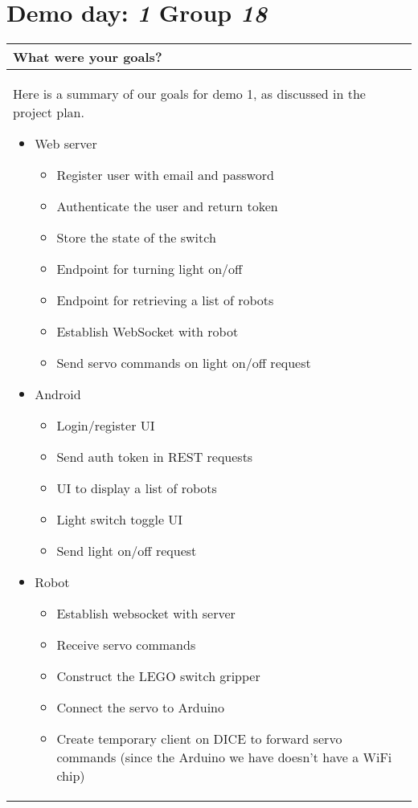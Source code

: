 \documentclass[a4paper]{article}
\newcommand{\colWidth}{141mm}
\begin{document}
 
\section*{Demo day: \textit{1} Group \textit{18}}


\begin{center}
\begin{tabular}{|p{\colWidth}|}
	\hline
	\cellcolor{blue!25}\large
	\textbf{What were your goals?}
	\\ \hline
		Here is a summary of our goals for demo 1, as discussed in the project plan.

		\begin{itemize}
			\item Web server 
				\begin{itemize}
					\item Register user with email and password
					\item Authenticate the user and return token
					\item Store the state of the switch
					\item Endpoint for turning light on/off
					\item Endpoint for retrieving a list of robots
					\item Establish WebSocket with robot
					\item Send servo commands on light on/off request
				\end{itemize}
			\item Android
				\begin{itemize}
					\item Login/register UI
					\item Send auth token in REST requests
					\item UI to display a list of robots
					\item Light switch toggle UI
					\item Send light on/off request
				\end{itemize}
			\item Robot
				\begin{itemize}
					\item Establish websocket with server
					\item Receive servo commands
					\item Construct the LEGO switch gripper
					\item Connect the servo to Arduino
					\item Create temporary client on DICE to forward servo commands (since the Arduino we have doesn’t have a WiFi chip)
				\end{itemize}
		\end{itemize}
  \\
  \hline
\end{tabular}
\vskip 5mm


\end{center}
\end{document}

